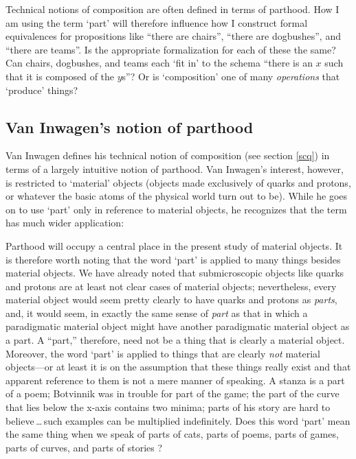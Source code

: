 \documentclass[11pt]{article}
\newenvironment{squote}{%
\begin{spacing}{1}
       	\begin{list}{}{%
\setlength{\labelwidth}{0pt}%
\rightmargin\leftmargin%
}
\item\relax
}{%
\end{list}%
\end{spacing}
}
\begin{document}
\begin{spacing}{1.25}
Technical notions of composition are often defined in terms of
parthood.  How I am using the term `part' will therefore influence how
I construct formal equivalences for propositions like ``there are
chairs'', ``there are dogbushes'', and ``there are teams''.  Is the
appropriate formalization for each of these the same?  Can chairs,
dogbushes, and teams each `fit in' to the schema ``there is an $x$
such that it is composed of the $y$s''?  Or is `composition' one of
many {\em operations} that `produce' things?

\subsection{Van Inwagen's notion of parthood}
\label{van-part}
Van Inwagen defines his technical notion of composition (see section
\ref{scq}) in terms of a largely intuitive notion of parthood.  Van
Inwagen's interest, however, is restricted to `material' objects
(objects made exclusively of quarks and protons, or whatever the basic
atoms of the physical world turn out to be).  While he goes on to use
`part' only in reference to material objects, he recognizes that the
term has much wider application:

\begin{squote}
Parthood will occupy a central place in the present study of material
objects.  It is therefore worth noting that the word `part' is applied
to many things besides material objects.  We have already noted that
submicroscopic objects like quarks and protons are at least not clear
cases of material objects; nevertheless, every material object would
seem pretty clearly to have quarks and protons as \emph{parts}, and,
it would seem, in exactly the same sense of \emph{part} as that in
which a paradigmatic material object might have another paradigmatic
material object as a part.  A ``part,'' therefore, need not be a thing
that is clearly a material object.  Moreover, the word `part' is
applied to things that are clearly \emph{not} material objects---or at
least it is on the assumption that these things really exist and that
apparent reference to them is not a mere manner of speaking.  A stanza
is a part of a poem; Botvinnik was in trouble for part of the game;
the part of the curve that lies below the x-axis contains two minima;
parts of his story are hard to believe\,\ldots\,such examples can be
multiplied indefinitely.  Does this word `part' mean the same thing
when we speak of parts of cats, parts of poems, parts of games, parts
of curves, and parts of stories \citeyearpar[18--19]{inwagen1995}?
\end{squote} 


\end{spacing}
\end{document}
